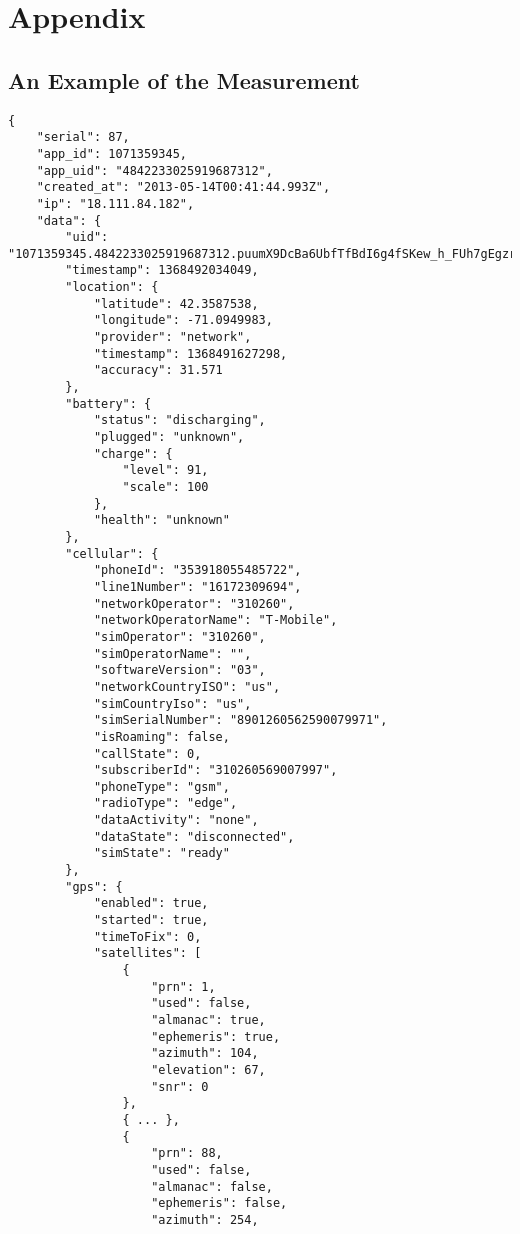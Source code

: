 \section{Appendix}
\label{s:appendix}

\subsection{An Example of the Measurement}
\tiny
\begin{verbatim}
{
    "serial": 87,
    "app_id": 1071359345,
    "app_uid": "4842233025919687312",
    "created_at": "2013-05-14T00:41:44.993Z",
    "ip": "18.111.84.182",
    "data": {
        "uid": "1071359345.4842233025919687312.puumX9DcBa6UbfTfBdI6g4fSKew_h_FUh7gEgzrUGBM",
        "timestamp": 1368492034049,
        "location": {
            "latitude": 42.3587538,
            "longitude": -71.0949983,
            "provider": "network",
            "timestamp": 1368491627298,
            "accuracy": 31.571
        },
        "battery": {
            "status": "discharging",
            "plugged": "unknown",
            "charge": {
                "level": 91,
                "scale": 100
            },
            "health": "unknown"
        },
        "cellular": {
            "phoneId": "353918055485722",
            "line1Number": "16172309694",
            "networkOperator": "310260",
            "networkOperatorName": "T-Mobile",
            "simOperator": "310260",
            "simOperatorName": "",
            "softwareVersion": "03",
            "networkCountryISO": "us",
            "simCountryIso": "us",
            "simSerialNumber": "8901260562590079971",
            "isRoaming": false,
            "callState": 0,
            "subscriberId": "310260569007997",
            "phoneType": "gsm",
            "radioType": "edge",
            "dataActivity": "none",
            "dataState": "disconnected",
            "simState": "ready"
        },
        "gps": {
            "enabled": true,
            "started": true,
            "timeToFix": 0,
            "satellites": [
                {
                    "prn": 1,
                    "used": false,
                    "almanac": true,
                    "ephemeris": true,
                    "azimuth": 104,
                    "elevation": 67,
                    "snr": 0
                },
                { ... },
                {
                    "prn": 88,
                    "used": false,
                    "almanac": false,
                    "ephemeris": false,
                    "azimuth": 254,

\end{verbatim}
